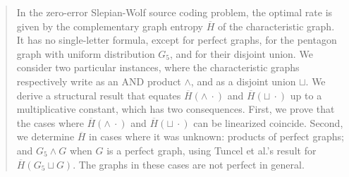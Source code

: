 \documentclass[conference,a4paper]{IEEEtran}
\begin{document}
\maketitle

\begin{abstract}
In the zero-error Slepian-Wolf source coding problem, the optimal rate is given by the complementary graph entropy $\overline{H}$ of the characteristic graph. It has no single-letter formula, except for perfect graphs, for the pentagon graph with uniform distribution $G_5$, and for their disjoint union. We consider two particular instances, where the characteristic graphs respectively write as an AND product $\wedge$, and as a disjoint union $\sqcup$. We derive a  structural result that equates $\overline{H}(\wedge \: \cdot)$ and $\overline{H}(\sqcup \: \cdot)$ up to a multiplicative constant, which has two consequences. First, we prove that the cases where $\overline{H}(\wedge \:\cdot)$ and $\overline{H}(\sqcup \: \cdot)$ can be linearized coincide. 
Second, we determine $\overline{H}$ in cases where it was unknown:
products of perfect graphs; and $G_5 \wedge G$ when $G$ is a perfect graph, using Tuncel et al.'s result for $\overline{H}(G_5 \sqcup G)$. The graphs in these cases are not perfect in general.



\end{abstract}
\end{document}
